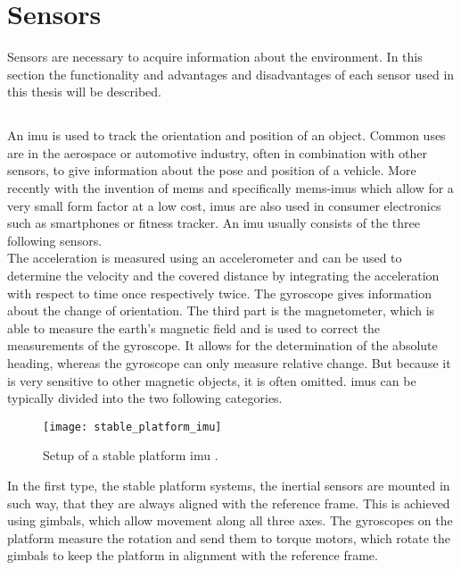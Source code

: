 \section{Sensors}
\label{sec:sensors}
Sensors are necessary to acquire information about the environment.
In this section the functionality and advantages and disadvantages of each sensor used in this thesis will be described.

\subsection{}
An \gls{imu} is used to track the orientation and position of an object.
Common uses are in the aerospace or automotive industry, often in combination with other sensors, to give information about the pose and position of a vehicle.
More recently with the invention of \gls{mems} and specifically \gls{mems}-\glspl{imu} which allow for a very small form factor at a low cost, \glspl{imu} are also used in consumer electronics such as smartphones or fitness tracker.
An \gls{imu} usually consists of the three following sensors.\\
The acceleration is measured using an accelerometer and can be used to determine the velocity and the covered distance by integrating the acceleration with respect to time once respectively twice.
The gyroscope gives information about the change of orientation.
The third part is the magnetometer, which is able to measure the earth's magnetic field and is used to correct the measurements of the gyroscope.
It allows for the determination of the absolute heading, whereas the gyroscope can only measure relative change. But because it is very sensitive to other magnetic objects, it is often omitted.
\glspl{imu} can be typically divided into the two following categories.\\
\begin{figure}[htb]
	\centering
	\texttt{[image: stable\_platform\_imu]}
	\caption[Setup of a stable platform \acrshort{imu}]{Setup of a stable platform \acrshort{imu} \cite{Woodman2007}.}
	\label{fig:stable_platform_imu}
\end{figure}
In the first type, the stable platform systems, the inertial sensors are mounted in such way, that they are always aligned with the reference frame.
This is achieved using gimbals, which allow movement along all three axes.
The gyroscopes on the platform measure the rotation and send them to torque motors, which rotate the gimbals to keep the platform in alignment with the reference frame.
